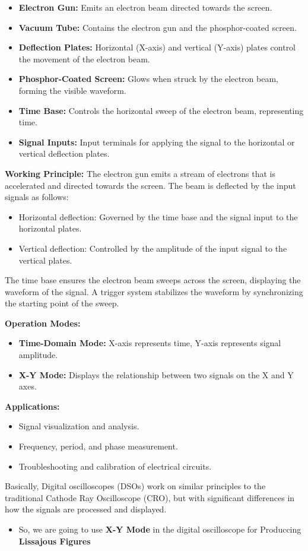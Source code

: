 \documentclass[12pt]{article}
\begin{document}
\begin{itemize}
    \item \textbf{Electron Gun:} Emits an electron beam directed towards the screen.
    \item \textbf{Vacuum Tube:} Contains the electron gun and the phosphor-coated screen.
    \item \textbf{Deflection Plates:} Horizontal (X-axis) and vertical (Y-axis) plates control the movement of the electron beam.
    \item \textbf{Phosphor-Coated Screen:} Glows when struck by the electron beam, forming the visible waveform.
    \item \textbf{Time Base:} Controls the horizontal sweep of the electron beam, representing time.
    \item \textbf{Signal Inputs:} Input terminals for applying the signal to the horizontal or vertical deflection plates.
\end{itemize}

\textbf{Working Principle:}
The electron gun emits a stream of electrons that is accelerated and directed towards the screen. The beam is deflected by the input signals as follows:
\begin{itemize}
    \item Horizontal deflection: Governed by the time base and the signal input to the horizontal plates.
    \item Vertical deflection: Controlled by the amplitude of the input signal to the vertical plates.
\end{itemize}

The time base ensures the electron beam sweeps across the screen, displaying the waveform of the signal. A trigger system stabilizes the waveform by synchronizing the starting point of the sweep.

\textbf{Operation Modes:}
\begin{itemize}
    \item \textbf{Time-Domain Mode:} X-axis represents time, Y-axis represents signal amplitude.
    \item \textbf{X-Y Mode:} Displays the relationship between two signals on the X and Y axes.
\end{itemize}

\textbf{Applications:}
\begin{itemize}
    \item Signal visualization and analysis.
    \item Frequency, period, and phase measurement.
    \item Troubleshooting and calibration of electrical circuits.
\end{itemize}
Basically, Digital oscilloscopes (DSOs) work on similar principles to the traditional Cathode Ray Oscilloscope (CRO), but with significant differences in how the signals are processed and displayed.
\begin{itemize}
    \item So, we are going to use \textbf{X-Y Mode} in the digital oscilloscope for Produccing \textbf{Lissajous Figures}
\end{itemize}
\end{document}
